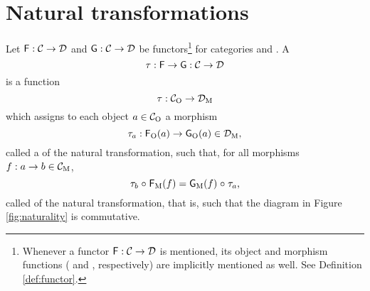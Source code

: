 \section{Natural transformations}
\label{sec:naturals}



\begin{definition}

  \label{def:natural}


  Let $\mathsf{F}: \mathcal{C} \to \mathcal{D}$ and $\mathsf{G}: \mathcal{C} \to
  \mathcal{D}$ be functors\footnote{Whenever a functor $\mathsf{F}: \mathcal{C}
    \to \mathcal{D}$ is mentioned, its object and morphism functions
    ( and , respectively) are implicitly mentioned
    as well. See Definition \ref{def:functor}.} for categories 
  and .
  A 
  \begin{equation}
    \label{eq:natural}
    \tau: \mathsf{F} \to \mathsf{G}: \mathcal{C} \to \mathcal{D}
  \end{equation}
  is a function
  \begin{equation}
    \label{eq:natural-transformation}
    \tau: \mathcal{C}_{\operatorname{O}} \to \mathcal{D}_{\operatorname{M}}
  \end{equation}
  which assigns to each object $a \in \mathcal{C}_{\operatorname{O}}$ a morphism
  \begin{equation*}
    \tau_{a}: \mathsf{F}_{\operatorname{O}}(a) \to \mathsf{G}_{\operatorname{O}}(a) \in \mathcal{D}_{\operatorname{M}}
    \text{,}
  \end{equation*}
  called a  of the natural transformation, such that,
  for all morphisms $f: a \to b \in \mathcal{C}_{\operatorname{M}}$,
  \begin{equation}
    \label{eq:naturality}
    \index{naturality}
    \natO{\tau}{b} \comp \funcM{F}(f) = \funcM{G}(f) \comp \natO{\tau}{a}
    \text{,}
  \end{equation}
  called  of the natural transformation, that is,
  such that the diagram in Figure \ref{fig:naturality} is commutative.
  \begin{figure}[htbp]
    \begin{center}
\end{center}
\end{figure}
\end{definition}
